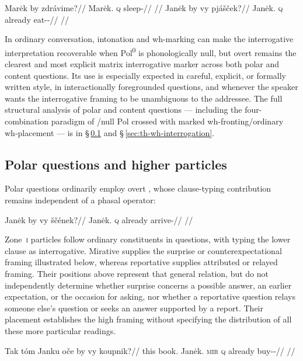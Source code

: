 \pex
\a
\begingl
\gla Marėk by zdrávime?//
\glb Marėk.\Dir{} \textsc{q} sleep-\Prog{}//
\glft {}//
\endgl
\a
\begingl
\gla Janėk by vy pjášček?//
\glb Janėk.\Dir{} \textsc{q} already eat-\Antip{}-\Pf{}//
\glft {}//
\endgl

\xe

\noindent In ordinary conversation, intonation and wh-marking can make the
interrogative interpretation recoverable when Pol\textsuperscript{0} is
phonologically null, but overt  remains the clearest
and most explicit matrix interrogative marker across both polar and content
questions. Its use is especially expected in careful, explicit, or formally
written style, in interactionally foregrounded questions, and whenever the
speaker wants the interrogative framing to be unambiguous to the addressee.
The full structural analysis of polar and content questions --- including the
four-combination paradigm of /null Pol crossed with
marked wh-fronting/ordinary wh-placement --- is in §\,\ref{sec:th-polar-questions} and
§\,\ref{sec:th-wh-interrogation}.

\subsection{Polar questions and higher particles}
\label{sec:th-polar-questions}

Polar questions ordinarily employ overt , whose clause-typing
contribution remains independent of a phasal operator:

\pex
\a
\begingl
\gla Janėk by vy ščének?//
\glb Janėk.\Dir{} \textsc{q} already arrive-\Pf{}//
\glft {}//
\endgl
\xe

Zone~\textsc{i} particles follow ordinary constituents in questions,
with  typing the lower clause as interrogative. Mirative 
supplies the surprise or counterexpectational framing illustrated below,
whereas reportative  supplies attributed or relayed framing. Their
positions above  represent that general relation, but do not
independently determine whether surprise concerns a possible answer, an
earlier expectation, or the occasion for asking, nor whether a reportative
question relays someone else's question or seeks an answer supported by a
report. Their placement establishes the high framing without
specifying the distribution of all these more particular readings.

\pex
\a
\begingl
\gla Tak tóm Janku oče by vy koupnik?//
\glb this book.\Dir{} Janėk.\Trs{} \textsc{mir} \textsc{q} already buy-\Trs{}-\Pf{}//
\glft {}//
\endgl
\xe

